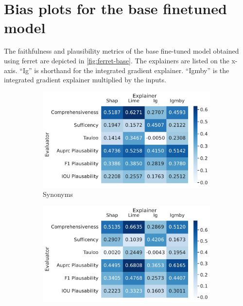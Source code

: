\section{Bias plots for the base finetuned model} \label{sec:bias_plots_base}

The faithfulness and plausibility metrics of the base fine-tuned model obtained using ferret are depicted in \autoref{fig:ferret-base}. The explainers are listed on the x-axis. \enquote{Ig} is shorthand for the integrated gradient explainer. \enquote{Igmby} is the integrated gradient explainer multiplied by the inputs.

\begin{figure}[t!]
    \centering
    \begin{subfigure}{0.49\textwidth}
        \includegraphics[width=\textwidth]{./images/ferret_heatmaps_phenomena/default_mnli/synonym.pdf}
        \caption{Synonyms}
    \end{subfigure}
    \begin{subfigure}{0.49\textwidth}
        \includegraphics[width=\textwidth]{./images/ferret_heatmaps_phenomena/default_mnli/antonym.pdf}

\end{subfigure}
\end{figure}
